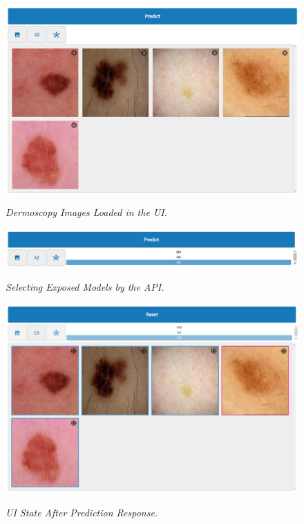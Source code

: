 \begin{figure}[H]
  \centering
  \begin{adjustbox}{width=\textwidth, trim={0cm 3.5cm 0cm 0cm}, clip}
    \includegraphics[width=\textwidth]{imatges/results/loaded-images.png}
  \end{adjustbox}
  \caption[Dermoscopy Images Loaded in the UI]{\textit{Dermoscopy Images Loaded in the UI. }}
  {\label{fig:loaded-images}}
\end{figure}

\begin{figure}[H]
  \centering
  \includegraphics[width=\textwidth]{imatges/results/selecting-model.png}
  \caption[Selecting Exposed Models by the API]{\textit{Selecting Exposed Models by the API. }}
  {\label{fig:selecting-model}}
\end{figure}

\begin{figure}[H]
  \centering
  \begin{adjustbox}{width=\textwidth, trim={0cm 3.55cm 0cm 0cm}, clip}
    \includegraphics[width=\textwidth]{imatges/results/after-prediction.png}
  \end{adjustbox}
  \caption[UI State After Prediction Response]{\textit{UI State After Prediction Response. }}
  {\label{fig:after-prediction}}
\end{figure}


